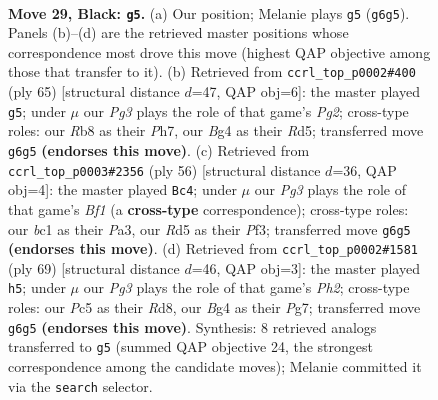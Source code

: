 \documentclass[11pt]{article}
\begin{document}
\clearpage

\begin{figure}[p]\centering
\begin{subfigure}{0.46\textwidth}\centering
\resizebox{\linewidth}{!}{%
\newchessgame
\chessboard[
  setfen={1r6/pp4k1/6pp/2pr4/4pPbP/N3P3/PP3K2/R1B5 b - - 3 29},
  showmover=false,
  pgfstyle=straightmove, color=movearrow, markmove={g6-g5}
]}
\caption{}
\end{subfigure}\hfill
\begin{subfigure}{0.46\textwidth}\centering
\resizebox{\linewidth}{!}{%
\newchessgame
\chessboard[
  setfen={8/5kpp/5p2/p2r4/1p2r3/1P3NB1/1PR3PP/5K2 b - - 4 33},
  showmover=false,
  pgfstyle=straightmove, color=movearrow, markmove={g7-g5}
]}
\caption{}
\end{subfigure}
\\[4pt]
\begin{subfigure}{0.46\textwidth}\centering
\resizebox{\linewidth}{!}{%
\newchessgame
\chessboard[
  setfen={r1b5/5k1p/2p3p1/p2n1pB1/8/PR3PP1/1P5P/5BK1 w - - 0 29},
  showmover=false,
  pgfstyle=straightmove, color=movearrow, markmove={f1-c4}
]}
\caption{}
\end{subfigure}\hfill
\begin{subfigure}{0.46\textwidth}\centering
\resizebox{\linewidth}{!}{%
\newchessgame
\chessboard[
  setfen={3r3k/6pp/5p2/p1p2P2/2P1b1P1/1PR5/4BK1P/8 b - - 1 35},
  showmover=false,
  pgfstyle=straightmove, color=movearrow, markmove={h7-h5}
]}
\caption{}
\end{subfigure}
\caption{\textbf{Move 29, Black: \texttt{g5}.} (a) Our position; Melanie plays \texttt{g5} (\texttt{g6g5}). Panels (b)--(d) are the retrieved master positions whose correspondence most drove this move (highest QAP objective among those that transfer to it). (b) Retrieved from \texttt{ccrl\_top\_p0002\#400} (ply 65) [structural distance $d$=47, QAP obj=6]: the master played \texttt{g5}; under $\mu$ our \emph{Pg3} plays the role of that game's \emph{Pg2}; cross-type roles: our \emph{R}b8 as their \emph{P}h7, our \emph{B}g4 as their \emph{R}d5; transferred move \texttt{g6g5} \textbf{(endorses this move)}. (c) Retrieved from \texttt{ccrl\_top\_p0003\#2356} (ply 56) [structural distance $d$=36, QAP obj=4]: the master played \texttt{Bc4}; under $\mu$ our \emph{Pg3} plays the role of that game's \emph{Bf1} (a \textbf{cross-type} correspondence); cross-type roles: our \emph{b}c1 as their \emph{P}a3, our \emph{R}d5 as their \emph{P}f3; transferred move \texttt{g6g5} \textbf{(endorses this move)}. (d) Retrieved from \texttt{ccrl\_top\_p0002\#1581} (ply 69) [structural distance $d$=46, QAP obj=3]: the master played \texttt{h5}; under $\mu$ our \emph{Pg3} plays the role of that game's \emph{Ph2}; cross-type roles: our \emph{P}c5 as their \emph{R}d8, our \emph{B}g4 as their \emph{P}g7; transferred move \texttt{g6g5} \textbf{(endorses this move)}. Synthesis: 8 retrieved analogs transferred to \texttt{g5} (summed QAP objective 24, the strongest correspondence among the candidate moves); Melanie committed it via the \texttt{search} selector.}
\label{fig:thought-m57}
\end{figure}
\end{document}
